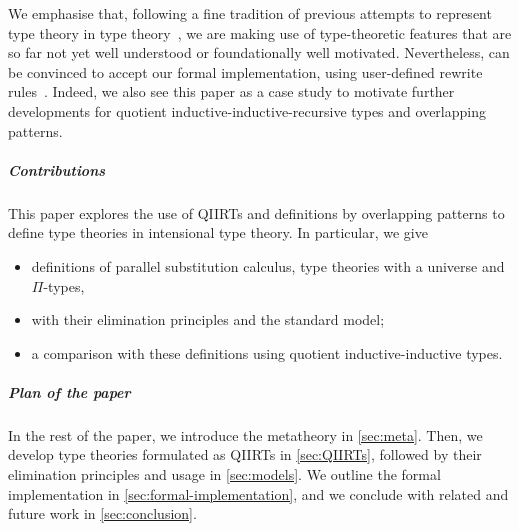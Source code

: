 \documentclass[a4paper,UKenglish,numberwithinsect,cleveref,thm-restate]{lipics-v2021}
\begin{document}

%
We emphasise that, following a fine tradition of previous attempts to represent type theory in type theory~\cite{Danielsson2006,Chapman2009,Altenkirch2016a}, we are making use of type-theoretic features that are so far not yet well understood or foundationally well motivated.
Nevertheless, \Agda can be convinced to accept our formal implementation, using user-defined rewrite rules~\cite{Cockx2020,Cockx2021}.
Indeed, we also see this paper as a case study to motivate further developments for quotient inductive-inductive-recursive types and overlapping patterns.

\subparagraph*{Contributions}
This paper explores the use of QIIRTs and definitions by overlapping patterns to define type theories in intensional type theory.
In particular, we give
\begin{itemize}
  \item definitions of parallel substitution calculus, type theories with a universe and $\Pi$-types,
  \item with their elimination principles and the standard model;
  \item a comparison with these definitions using quotient inductive-inductive types.
\end{itemize}

\subparagraph*{Plan of the paper}
In the rest of the paper, we introduce the metatheory in \cref{sec:meta}.
Then, we develop type theories formulated as QIIRTs in \cref{sec:QIIRTs}, followed by their elimination principles and usage in \cref{sec:models}.
We outline the \Agda formal implementation in \cref{sec:formal-implementation}, and we conclude with related and future work in \cref{sec:conclusion}.
\end{document}

